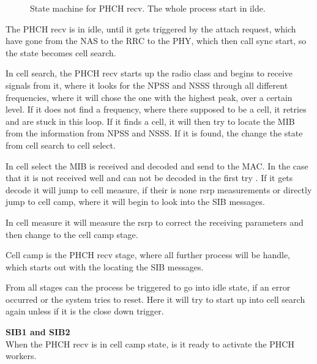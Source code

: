\begin{figure}[H]
\centering
{}
\resizebox{0.5\textwidth}{!}{
}
\caption{State machine for PHCH recv. The whole process start in ilde.}
\label{fig:RecvState}
\end{figure}

The PHCH recv is in idle, until it gets triggered by the attach request, which have gone from the NAS to the RRC to the PHY, which then call sync start, so the state becomes cell search.

In cell search, the PHCH recv starts up the radio class and begins to receive signals from it, where it looks for the NPSS and NSSS through all different frequencies, where it will chose the one with the highest peak, over a certain level. If it does not find a frequency, where there supposed to be a cell, it retries and are stuck in this loop. If it finds a cell, it will then try to locate the MIB from the information from NPSS and NSSS. If it is found, the change the state from cell search to cell select.

In cell select the MIB is received and decoded and send to the MAC. In the case that it is not received well and can not be decoded in the first try . If it gets decode it will jump to cell measure, if their is none rsrp measurements  or directly jump to cell camp, where it will begin to look into the SIB messages.

In cell measure it will measure the rsrp to correct the receiving parameters and then change to the cell camp stage.

Cell camp is the PHCH recv stage, where all further process will be handle, which starts out with the locating the SIB messages.

From all stages can the process be triggered to go into idle state, if an error occurred or the system tries to reset. Here it will try to start up into cell search again unless if it is the close down trigger.

\textbf{SIB1 and SIB2} \\
When the PHCH recv is in cell camp state, is it ready to activate the PHCH workers.




















